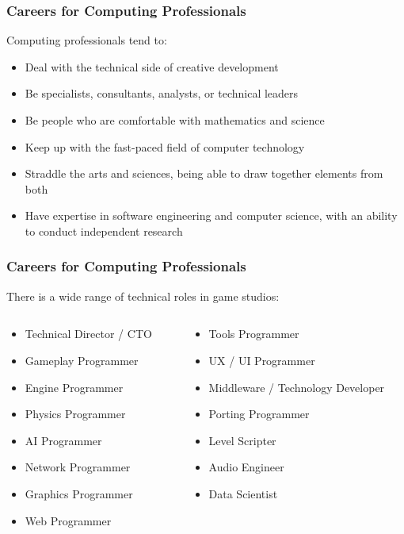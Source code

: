 \begin{frame}
	\frametitle{Careers for Computing Professionals}
	
	Computing professionals tend to:
	
	\begin{itemize}
		\item Deal with the technical side of creative development \pause
		\item Be specialists, consultants, analysts, or technical leaders \pause
		\item Be people who are comfortable with mathematics and science \pause
		\item Keep up with the fast-paced field of computer technology \pause
		\item Straddle the arts and sciences, being able to draw together elements from both \pause
		\item Have expertise in software engineering and computer science, with an ability to conduct independent research
	\end{itemize}
\end{frame}

\begin{frame}
	\frametitle{Careers for Computing Professionals}
	
	There is a wide range of technical roles in game studios:
	
	\begin{columns}
		\begin{column}{0.5\textwidth}
			\begin{itemize}
				\item Technical Director / CTO
				\item Gameplay Programmer
				\item Engine Programmer
				\item Physics Programmer
				\item AI Programmer
				\item Network Programmer
				\item Graphics Programmer
				\item Web Programmer
			\end{itemize}
		\end{column}
		\begin{column}{0.5\textwidth}
			\begin{itemize}
				\item Tools Programmer
				\item UX / UI Programmer
				\item Middleware / Technology Developer
				\item Porting Programmer
				\item Level Scripter
				\item Audio Engineer
				\item Data Scientist
			\end{itemize}
		\end{column}
	\end{columns}
\end{frame}

